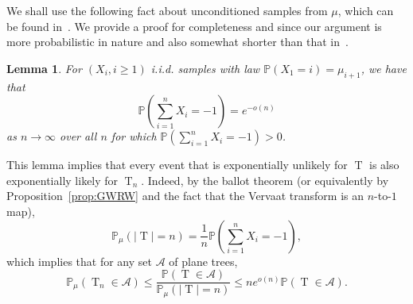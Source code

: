 \documentclass[10pt]{amsart}
\newtheorem{lemm}[theo]{Lemma}\newtheorem{prop}[theo]{Proposition}\newtheorem{coro}[theo]{Corollary}\newtheorem{conj}[theo]{Conjecture}
\theoremstyle{definition}\newtheorem{defi}[theo]{Definition}\newtheorem{rema}[theo]{Remark}\newtheorem{exam}[theo]{Example}\newtheorem{exem}[theo]{Example}\newtheorem{nota}[theo]{Notation}
\renewcommand{\P}{\mathbb{P}}
\DeclareMathOperator{\rtree}{T}
\newcommand\cA{\mathcal{A}}
\begin{document}
We shall use the following fact about unconditioned samples from $\mu$, which can be found in~\cite[Lemmas~14.3 and~14.4]{Jan12}. We provide a proof for completeness and since our argument is {more probabilistic in nature and also} somewhat shorter than that in~\cite{Jan12}.
\begin{lemm}\label{lem:probtree}
For $(X_i,i \ge 1)$ i.i.d. samples with law $\P(X_1=i)=\mu_{i+1}$, we have that
\[
\P\left(\sum_{i=1}^n X_i=-1\right)=e^{-o(n)}
\]
as $n\to \infty$ over all $n$ for which $\P\left(\sum_{i=1}^n X_i=-1\right)>0$.
\end{lemm} This lemma implies that every event that is exponentially unlikely for $\rtree$ is also exponentially likely for $\rtree_n$. Indeed, by the ballot theorem (or equivalently by Proposition~\ref{prop:GWRW} and the fact that the Vervaat transform is an $n$-to-$1$ map),
\[
\P_\mu(|\rtree|=n)=\frac{1}{n}\P\left(\sum_{i=1}^n X_i=-1\right),
\]
which implies that for any set $\cA$ of plane trees,
\[
\P_\mu(\rtree_{n} \in \cA)\leq \frac{\P(\rtree \in \cA)}{\P_\mu(|\rtree|=n)}\leq ne^{o(n)} \P(\rtree \in \cA).
\]
\end{document}
